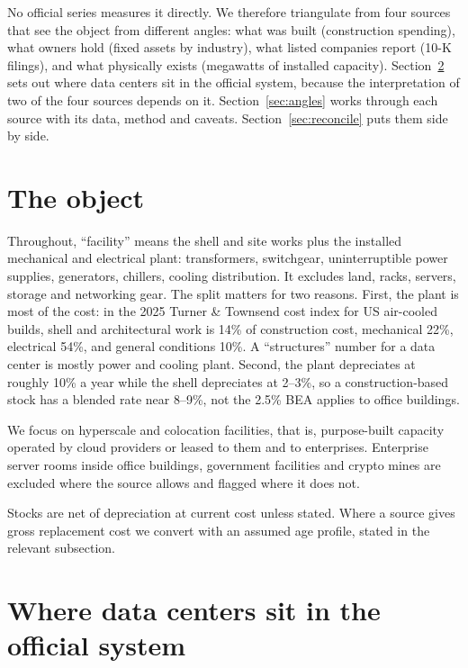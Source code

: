 \documentclass[11pt]{article}
\begin{document}
No official series measures it directly. We therefore triangulate from four sources that see the object from different angles: what was built (construction spending), what owners hold (fixed assets by industry), what listed companies report (10-K filings), and what physically exists (megawatts of installed capacity). Section~\ref{sec:where} sets out where data centers sit in the official system, because the interpretation of two of the four sources depends on it. Section~\ref{sec:angles} works through each source with its data, method and caveats. Section~\ref{sec:reconcile} puts them side by side.

\section{The object}

Throughout, ``facility'' means the shell and site works plus the installed mechanical and electrical plant: transformers, switchgear, uninterruptible power supplies, generators, chillers, cooling distribution. It excludes land, racks, servers, storage and networking gear. The split matters for two reasons. First, the plant is most of the cost: in the 2025 Turner \& Townsend cost index for US air-cooled builds, shell and architectural work is 14\% of construction cost, mechanical 22\%, electrical 54\%, and general conditions 10\%. A ``structures'' number for a data center is mostly power and cooling plant. Second, the plant depreciates at roughly 10\% a year while the shell depreciates at 2--3\%, so a construction-based stock has a blended rate near 8--9\%, not the 2.5\% BEA applies to office buildings.

We focus on hyperscale and colocation facilities, that is, purpose-built capacity operated by cloud providers or leased to them and to enterprises. Enterprise server rooms inside office buildings, government facilities and crypto mines are excluded where the source allows and flagged where it does not.

Stocks are net of depreciation at current cost unless stated. Where a source gives gross replacement cost we convert with an assumed age profile, stated in the relevant subsection.

\section{Where data centers sit in the official system}
\label{sec:where}
\end{document}

